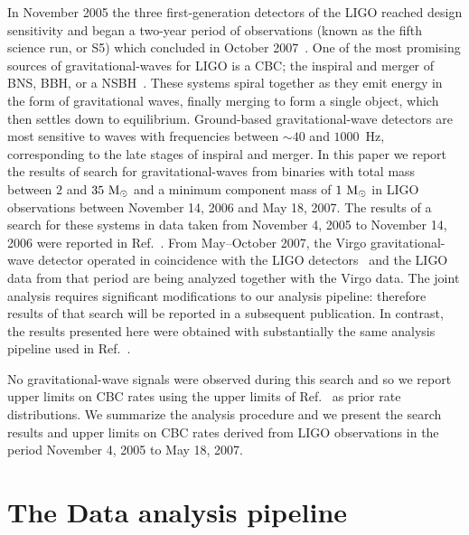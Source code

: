 In November 2005 the three first-generation detectors of the \ac{LIGO} reached
design sensitivity and began a two-year period of observations (known as the
fifth science run, or S5) which concluded in October 
2007~\cite{abbott:2007kva}.  One of the most promising sources of 
gravitational-waves for LIGO is a \ac{CBC}; the inspiral and merger of 
\ac{BNS}, \ac{BBH}, or a \ac{NSBH}~\cite{LIGOS1iul,LIGOS2iul,LIGOS2macho,
LIGOS2bbh,LIGOS3S4all,Collaboration:2009tt}. These systems spiral together as
they emit energy in the form of gravitational waves, finally merging to form a 
single object, which then settles down to equilibrium. Ground-based 
gravitational-wave detectors are most sensitive to waves with frequencies 
between $\sim 40$ and $1000$~Hz, corresponding to the late stages of inspiral 
and merger. In this paper we report the results of search for 
gravitational-waves from binaries with total mass between $2$ and $35~\mathrm{M_\odot}$ 
and a minimum component mass of $1~\mathrm{M_\odot}$ in LIGO observations between November 
14, 2006 and May 18, 2007. The results of a search for these systems in data 
taken from November 4, 2005 to November 14, 2006 were reported in 
Ref.~\cite{Collaboration:2009tt}. From May--October 2007, the Virgo 
gravitational-wave detector operated in coincidence with the \ac{LIGO} 
detectors~\cite{0264-9381-23-19-S01} and the \ac{LIGO} data from that period 
are being analyzed together with the Virgo data. The joint analysis requires 
significant modifications to our analysis pipeline: therefore results of that 
search will be reported in a subsequent publication. In contrast, the results 
presented here were obtained with substantially the same analysis pipeline used 
in Ref.~\cite{Collaboration:2009tt}.  

No gravitational-wave signals were observed during this search and so we
report upper limits on CBC rates using the upper limits of 
Ref.~\cite{Collaboration:2009tt} as prior rate distributions. We summarize the 
analysis procedure and we present the search results and upper limits on CBC 
rates derived from \ac{LIGO} observations in the period November 4, 2005 to May
18, 2007.

\section{The Data analysis pipeline}
\label{sec:pipeline}


